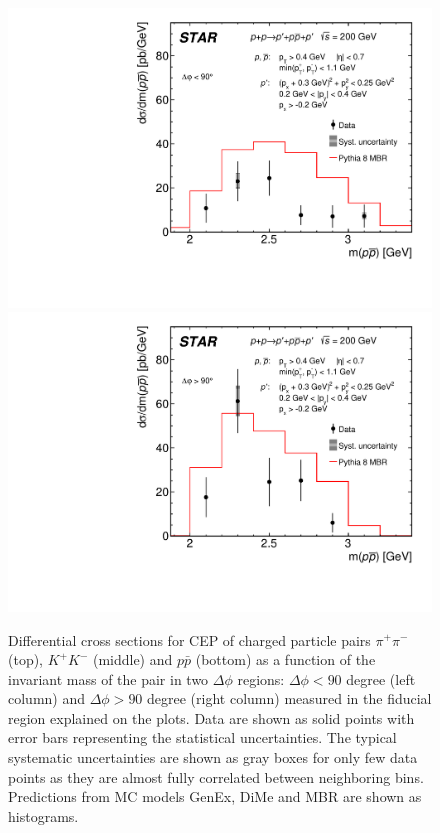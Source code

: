 \begin{figure}[h]
\hspace*{5pt}
\includegraphics[width=.46\textwidth,page=1]{graphics/physicsResults/FinalResult_InvMass_DeltaPhiBin1_proton.pdf}
\hfill
\includegraphics[width=.46\textwidth,page=1]{graphics/physicsResults/FinalResult_InvMass_DeltaPhiBin2_proton.pdf}
\hspace*{5pt}
%
\caption{Differential cross sections for CEP of charged particle pairs $\pi^+\pi^-$ (top), $K^+K^-$ (middle) and $p\bar{p}$ (bottom) as a function of the invariant mass of the pair in two $\Delta\phi$ regions: $\Delta\phi<90$ degree (left column) and $\Delta\phi>90$ degree (right column) measured in the fiducial region explained on the plots. Data are shown as solid points with error bars representing the statistical uncertainties. The typical systematic uncertainties are shown as gray boxes for only few data points as they are almost fully correlated between neighboring bins. Predictions from MC models GenEx, DiMe and MBR are shown as histograms.}
\label{results_3}
\end{figure}



